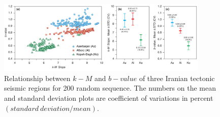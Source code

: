    

\begin{figure}%
	\centering
	\includegraphics[width=0.9\textwidth]{figures/pdf/figure-08} 
	\caption{Relationship between $k-M$ and $b-value$ of three Iranian tectonic seismic regions for 200 random sequence. The numbers on the mean and standard deviation plots are coefficient of variations in percent $(standard \ deviation / mean)$.}
	\label{fig:random}
\end{figure}

